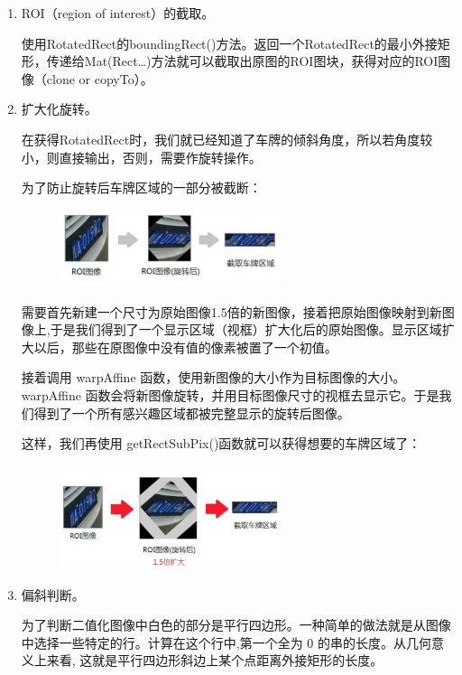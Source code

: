 \begin{enumerate}
\item
ROI（region of interest）的截取。

使用RotatedRect的boundingRect()方法。返回一个RotatedRect的最小外接矩形，传递给Mat(Rect…)方法就可以截取出原图的ROI图块，获得对应的ROI图像（clone or copyTo）。
\item
扩大化旋转。

在获得RotatedRect时，我们就已经知道了车牌的倾斜角度，所以若角度较小，则直接输出，否则，需要作旋转操作。

为了防止旋转后车牌区域的一部分被截断：
\begin{figure}[H]
    \centering 
    \includegraphics[width=0.618\textwidth]{image/2_6_4_2.jpg}    
    \label{logic}
\end{figure}
需要首先新建一个尺寸为原始图像1.5倍的新图像，接着把原始图像映射到新图像上,于是我们得到了一个显示区域（视框）扩大化后的原始图像。显示区域扩大以后，那些在原图像中没有值的像素被置了一个初值。 

接着调用 warpAffine 函数，使用新图像的大小作为目标图像的大小。warpAffine 函数会将新图像旋转，并用目标图像尺寸的视框去显示它。于是我们得到了一个所有感兴趣区域都被完整显示的旋转后图像。 

这样，我们再使用 getRectSubPix()函数就可以获得想要的车牌区域了：

\begin{figure}[H]
    \centering 
    \includegraphics[width=0.618\textwidth]{image/2_6_4_3.jpg}    
    \label{logic}
\end{figure}
\item
偏斜判断。

为了判断二值化图像中白色的部分是平行四边形。一种简单的做法就是从图像中选择一些特定的行。计算在这个行中,第一个全为 0 的串的长度。从几何意义上来看, 这就是平行四边形斜边上某个点距离外接矩形的长度。 


\end{enumerate}
